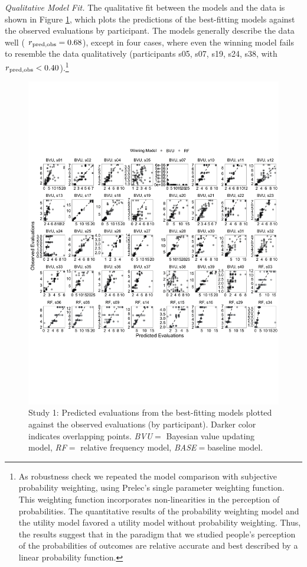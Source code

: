 \documentclass[
  a4paper, man, floatsintext]{apa6}
\begin{document}
\textit{Qualitative Model Fit.} The qualitative fit between the models
and the data is shown in Figure \ref{fig:fig3}, which plots the
predictions of the best-fitting models against the observed evaluations
by participant. The models generally describe the data well
( \(r\textsubscript{pred,obs} = 0.68\)),
except in four cases, where even the winning model fails to resemble the
data qualitatively (participants s05, s07, s19, s24, s38, with
\(r\textsubscript{pred,obs} < 0.40\)).\footnote{As robustness check we repeated the model comparison with subjective probability weighting, using Prelec’s \citeyear{Prelec1998} single parameter weighting function. This weighting function incorporates non-linearities in the perception of probabilities. The quantitative results of the probability weighting model and the utility model favored a utility model without probability weighting. Thus, the results suggest that in the paradigm that we studied people's perception of the probabilities of outcomes are relative accurate and best described by a linear probability function.}

\begin{figure}[htb]

{\centering \includegraphics[width=\textwidth]{../figures/fig3-1} 

}

\caption{Study 1: Predicted evaluations from the best-fitting models plotted against the observed evaluations (by participant). Darker color indicates overlapping points. \textit{BVU}$=$ Bayesian value updating model, \textit{RF}$=$ relative frequency model, \textit{BASE}$=$baseline model.}\label{fig:fig3}
\end{figure}
\end{document}
